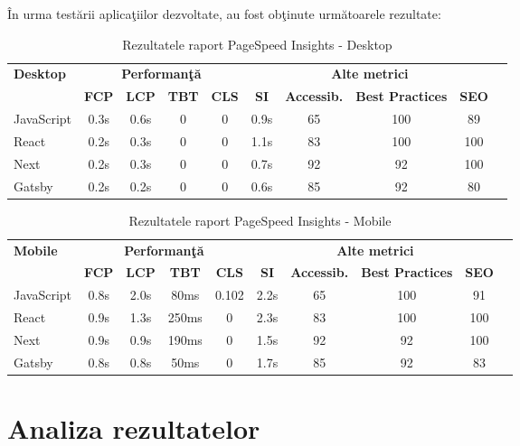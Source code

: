 \documentclass[12pt, a4paper]{report}
\begin{document}
\^In urma test\u arii aplica\c tiilor dezvoltate, au fost ob\c tinute urm\u atoarele rezultate:

\begin{table}[htbp]
	\centering
	\begin{tabular}{lccccccccc}
		\toprule
		\multirow{2}{*}{\textbf{Desktop}} & \multicolumn{4}{c}{\textbf{Performan\c t\u a}} & \multicolumn{4}{c}{\textbf{Alte metrici}} \\
		\cmidrule(lr){2-6} \cmidrule(l){7-9}
		& \textbf{FCP} & \textbf{LCP} & \textbf{TBT} & \textbf{CLS} & \textbf{SI} & \textbf{Accessib.} & \textbf{Best Practices} & \textbf{SEO}\\
		\midrule
		JavaScript & 0.3s & 0.6s & 0 & 0 & 0.9s & 65 & 100 & 89 \\
		React & 0.2s & 0.3s & 0 & 0 & 1.1s & 83 & 100 & 100 \\
		Next & 0.2s & 0.3s & 0 & 0 & 0.7s & 92 & 92 & 100 \\
		Gatsby & 0.2s & 0.2s & 0 & 0 & 0.6s & 85 & 92 & 80 \\
		\bottomrule
	\end{tabular}
	\caption{Rezultatele raport PageSpeed Insights - Desktop}
	\label{tab:metrics-pagespeed-desktop}
\end{table}


\begin{table}[htbp]
	\centering
	\begin{tabular}{lccccccccc}
		\toprule
		\multirow{2}{*}{\textbf{Mobile}} & \multicolumn{4}{c}{\textbf{Performan\c t\u a}} & \multicolumn{4}{c}{\textbf{Alte metrici}} \\
		\cmidrule(lr){2-6} \cmidrule(l){7-9}
		& \textbf{FCP} & \textbf{LCP} & \textbf{TBT} & \textbf{CLS} & \textbf{SI} & \textbf{Accessib.} & \textbf{Best Practices} & \textbf{SEO}\\
		\midrule
		JavaScript & 0.8s & 2.0s & 80ms & 0.102 & 2.2s & 65 & 100 & 91 \\
		React & 0.9s & 1.3s & 250ms & 0 & 2.3s & 83 & 100 & 100 \\
		Next & 0.9s & 0.9s & 190ms & 0 & 1.5s & 92 & 92 & 100 \\
		Gatsby & 0.8s & 0.8s & 50ms & 0 & 1.7s & 85 & 92 & 83 \\
		\bottomrule
	\end{tabular}
	\caption{Rezultatele raport PageSpeed Insights - Mobile}
	\label{tab:metrics-pagespeed-mobile}
\end{table}


\section {Analiza rezultatelor}
\end{document}

